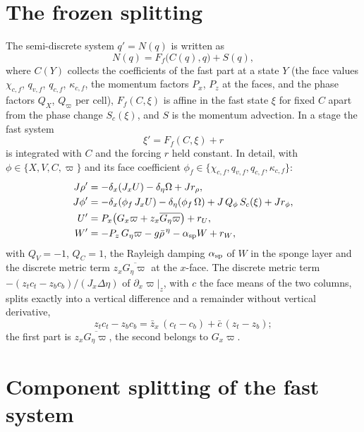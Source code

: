 \documentclass[11pt,a4paper]{article}
\newcommand{\pv}{\varpi}      %
\newcommand{\fs}{\xi}         %
\begin{document}
\section{The frozen splitting}\label{sec:frozen}
The semi-discrete system $q'=N(q)$ is written as
\[
N(q)=F_f\big(C(q),q\big)+S(q),
\]
where $C(Y)$ collects the coefficients of the fast part at a state $Y$ (the face values $\chi_{c,f}$,
$q_{v,f}$, $q_{c,f}$, $\kappa_{c,f}$, the momentum factors $P_x$, $P_z$ at the faces, and the phase
factors $Q_X$, $Q_\pv$ per cell), $F_f(C,\fs)$ is affine in the fast state $\fs$ for fixed $C$ apart from the
phase change $S_c(\fs)$, and $S$ is the momentum advection. In a stage the fast system
\[
\fs'=F_f(C,\fs)+r
\]
is integrated with $C$ and the forcing $r$ held constant. In detail, with $\phi\in\{X,V,C,\pv\}$ and its
face coefficient $\phi_f\in\{\chi_{c,f},q_{v,f},q_{c,f},\kappa_{c,f}\}$:
\begin{align*}
J\rho'&=-\delta_x(J_xU)-\delta_\eta\Omega+Jr_\rho,\\
J\phi'&=-\delta_x(\phi_f\,J_xU)-\delta_\eta(\phi_f\,\Omega)+J\,Q_\phi\,S_c(\fs)+Jr_\phi,\\
U'&=P_x\big(G_x\pv+z_x\overline{G_\eta\pv}\big)+r_U,\\
W'&=-P_z\,G_\eta\pv-g\bar\rho^{\,\eta}-\alpha_{\rm sp}W+r_W,
\end{align*}
with $Q_V=-1$, $Q_C=1$, the Rayleigh damping $\alpha_{\rm sp}$ of $W$ in the sponge layer and the
discrete metric term $z_x\overline{G_\eta\pv}$ at the $x$-face. The discrete metric term
$-(z_tc_t-z_bc_b)/(J_x\Delta\eta)$ of $\partial_x\pv|_z$, with $c$ the face means of the two columns, splits
exactly into a vertical difference and a remainder without vertical derivative,
\[
z_tc_t-z_bc_b=\bar z_x\,(c_t-c_b)+\bar c\,(z_t-z_b);
\]
the first part is $z_x\overline{G_\eta\pv}$, the second belongs to $G_x\pv$.

\section{Component splitting of the fast system}\label{sec:ei}
\end{document}
